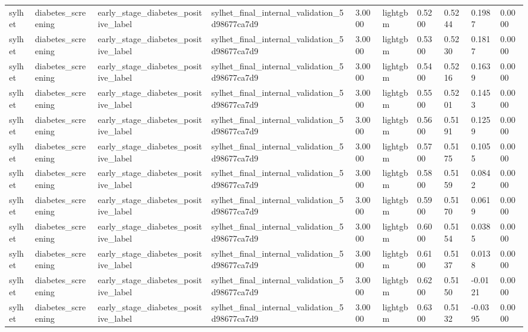 \begin{tabular}{llllllllll}
sylhet & diabetes\_screening & early\_stage\_diabetes\_positive\_label & sylhet\_final\_internal\_validation\_5d98677ca7d9 & 3.0000 & lightgbm & 0.5200 & 0.5244 & 0.1987 & 0.0000 \\
sylhet & diabetes\_screening & early\_stage\_diabetes\_positive\_label & sylhet\_final\_internal\_validation\_5d98677ca7d9 & 3.0000 & lightgbm & 0.5300 & 0.5230 & 0.1817 & 0.0000 \\
sylhet & diabetes\_screening & early\_stage\_diabetes\_positive\_label & sylhet\_final\_internal\_validation\_5d98677ca7d9 & 3.0000 & lightgbm & 0.5400 & 0.5216 & 0.1639 & 0.0000 \\
sylhet & diabetes\_screening & early\_stage\_diabetes\_positive\_label & sylhet\_final\_internal\_validation\_5d98677ca7d9 & 3.0000 & lightgbm & 0.5500 & 0.5201 & 0.1453 & 0.0000 \\
sylhet & diabetes\_screening & early\_stage\_diabetes\_positive\_label & sylhet\_final\_internal\_validation\_5d98677ca7d9 & 3.0000 & lightgbm & 0.5600 & 0.5191 & 0.1259 & 0.0000 \\
sylhet & diabetes\_screening & early\_stage\_diabetes\_positive\_label & sylhet\_final\_internal\_validation\_5d98677ca7d9 & 3.0000 & lightgbm & 0.5700 & 0.5175 & 0.1055 & 0.0000 \\
sylhet & diabetes\_screening & early\_stage\_diabetes\_positive\_label & sylhet\_final\_internal\_validation\_5d98677ca7d9 & 3.0000 & lightgbm & 0.5800 & 0.5159 & 0.0842 & 0.0000 \\
sylhet & diabetes\_screening & early\_stage\_diabetes\_positive\_label & sylhet\_final\_internal\_validation\_5d98677ca7d9 & 3.0000 & lightgbm & 0.5900 & 0.5170 & 0.0619 & 0.0000 \\
sylhet & diabetes\_screening & early\_stage\_diabetes\_positive\_label & sylhet\_final\_internal\_validation\_5d98677ca7d9 & 3.0000 & lightgbm & 0.6000 & 0.5154 & 0.0385 & 0.0000 \\
sylhet & diabetes\_screening & early\_stage\_diabetes\_positive\_label & sylhet\_final\_internal\_validation\_5d98677ca7d9 & 3.0000 & lightgbm & 0.6100 & 0.5137 & 0.0138 & 0.0000 \\
sylhet & diabetes\_screening & early\_stage\_diabetes\_positive\_label & sylhet\_final\_internal\_validation\_5d98677ca7d9 & 3.0000 & lightgbm & 0.6200 & 0.5150 & -0.0121 & 0.0000 \\
sylhet & diabetes\_screening & early\_stage\_diabetes\_positive\_label & sylhet\_final\_internal\_validation\_5d98677ca7d9 & 3.0000 & lightgbm & 0.6300 & 0.5132 & -0.0395 & 0.0000 \\

\end{tabular}
